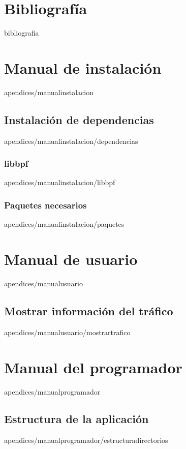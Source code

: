 \documentclass[epsbased,copyright,final,printable,covers,extendedindex,firstnumbered,tfg,gnuplot]{tfgtfmthesisuam}
\begin{document}
\chapter{Bibliografía\label{CAP:CONCLUSIONES}}{bibliografia}

\appendix

\chapter{Manual de instalación\label{CAP:INSTALACION}}{apendices/manualinstalacion}
  \section{Instalación de dependencias\label{SEC:DEPENDENCIAS}}{apendices/manualinstalacion/dependencias}
    \subsection{libbpf\label{SEC:LIBBPF}}{apendices/manualinstalacion/libbpf}
    \subsection{Paquetes necesarios\label{SEC:PAQUETES}}{apendices/manualinstalacion/paquetes}
    
\chapter{Manual de usuario\label{CAP: PROGRAMADOR}}{apendices/manualusuario}
    \section{Mostrar información del tráfico\label{SEC:MOSTRARTRAFICO}}{apendices/manualusuario/mostrartrafico}


\chapter{Manual del programador\label{CAP: PROGRAMADOR}}{apendices/manualprogramador}
    \section{Estructura de la aplicación\label{SEC:ESTRUCTURAAPlICACION}}{apendices/manualprogramador/estructuradirectorios}
\end{document}
